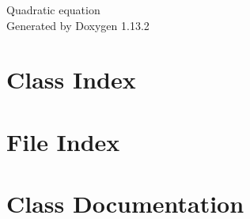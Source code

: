 \documentclass[twoside]{book}
\newcommand{\+}{\discretionary{\mbox{\scriptsize$\hookleftarrow$}}{}{}}
\newcommand{\clearemptydoublepage}{%
    \newpage{\pagestyle{empty}\cleardoublepage}%
  }
\begin{document}
  \raggedbottom
    \hypersetup{pageanchor=false,
                bookmarksnumbered=true,
                pdfencoding=unicode
               }
  \begin{titlepage}
  \vspace*{7cm}
  \begin{center}%
  {\Large Quadratic equation}\\
  \vspace*{1cm}
  {\large Generated by Doxygen 1.13.2}\\
  \end{center}
  \end{titlepage}
  \clearemptydoublepage
  \tableofcontents
  \clearemptydoublepage
  \hypersetup{pageanchor=true}
\chapter{Class Index}

\chapter{File Index}

\chapter{Class Documentation}












































\end{document}
